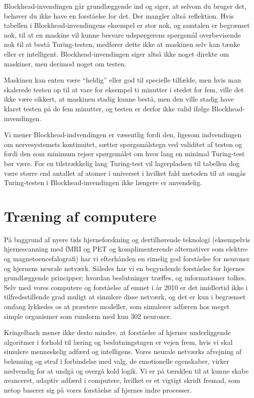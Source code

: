 \documentclass{article}
\begin{document}
Blockhead-invendingen går grundlæggende ind og siger, at selvom du bruger det, behøver du ikke have en forståelse for det. Der mangler altså reflektion.
Hvis tabellen i Blockhead-invendingens eksempel er stor nok, og samtalen er begrænset nok, til at en maskine vil kunne besvare udspørgerens spørgsmål overbevisende nok til at bestå Turing-testen, medfører dette ikke at maskinen selv kan tænke eller er intelligent. Blockhead-invendingen siger altså ikke noget direkte om maskiner, men derimod noget om testen.

Maskinen kan enten være ``heldig'' eller god til specielle tilfælde, men hvis man skalerede testen op til at vare for eksempel ti minutter i stedet for fem, ville det ikke være sikkert, at maskinen stadig kunne bestå, men den ville stadig have klaret testen på de fem minutter, og testen er derfor ikke valid ifølge Blockhead-invendingen.

Vi mener Blockhead-indvendingen er væsentlig fordi den, ligesom indvendingen om nervesystemets kontinuitet, sætter spørgsmålstegn ved validitet af testen og fordi den som minimum rejser spørgsmålet om hvor lang en minimal Turing-test bør være. For en tilstrækkelig lang Turing-test vil lagerpladsen til tabellen dog være større end antallet af atomer i universet i hvilket fald metoden til at omgås Turing-testen i Blockhead-invendingen ikke længere er anvendelig.

\section{Træning af computere}
På baggrund af nyere tids hjerneforskning og dertilhørende teknologi (eksempelvis hjernescanning med fMRI og PET og komplimenterende alternativer som elektro- og magnetoencefalografi) har vi efterhånden en rimelig god forståelse for neuroner og hjernens neurale netværk. Således har vi en begyndende forståelse for hjernes grundlæggende principper; hvordan beslutninger træffes, og informationer tolkes. Selv med vores computere og forståelse af emnet i år 2010 er det imidlertid ikke i tilfredsstillende grad muligt at simulere disse netværk, og det er kun i begrænset omfang lykkedes os at præstere modeller, som simulerer adfæren hos meget simple organismer som rundorm med kun 302 neuroner.

Kringelbach mener ikke desto mindre, at forståelse af hjernes underliggende algoritmer i forhold til læring og beslutningstagen er vejen frem, hvis vi skal simulere menneskelig adfærd og intelligens. Vores neurale netværks afvejning af belønning og straf i forbindelse med valg, de emotionelle egenskaber, virker nødvendig for at undgå og overgå kold logik. Vi er på tærsklen til at kunne skabe avanceret, adaptiv adfærd i computere, hvilket er et vigtigt skridt fremad, som netop baserer sig på vores forståelse af hjernes indre processer.
\end{document}
